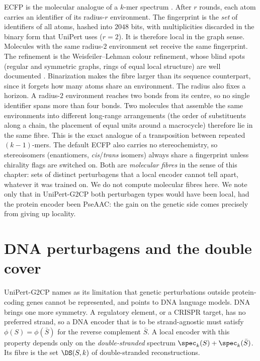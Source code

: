 ECFP is the molecular analogue of a $k$-mer spectrum \cite{RH10}. After $r$ rounds, each atom carries
an identifier of its radius-$r$ environment. The fingerprint is the \emph{set} of identifiers of all
atoms, hashed into $2048$ bits, with multiplicities discarded in the binary form that UniPert uses
($r=2$). It is therefore local in the graph sense. Molecules with the same radius-$2$ environment
set receive the same fingerprint. The refinement is the Weisfeiler--Lehman colour refinement, whose
blind spots (regular and symmetric graphs, rings of equal local structure) are well
documented \cite{XHLJ19}. Binarization makes the fibre larger than its sequence counterpart, since it
forgets how many atoms share an environment. The radius also fixes a horizon. A radius-$2$
environment reaches two bonds from its centre, so no single identifier spans more than four bonds.
Two molecules that assemble the same environments into different long-range arrangements (the
order of substituents along a chain, the placement of equal units around a macrocycle) therefore
lie in the same fibre. This is the exact analogue of a transposition between repeated
$(k-1)$-mers. The default ECFP also carries no stereochemistry, so stereoisomers (enantiomers,
\emph{cis}/\emph{trans} isomers) always share a fingerprint unless chirality flags are switched on.
Both are \emph{molecular fibres} in the sense of this chapter: sets of distinct perturbagens that a local
encoder cannot tell apart, whatever it was trained on. We do not compute molecular fibres here. We note only
that in UniPert-G2CP both perturbagen types would have been local, had the protein encoder been
PseAAC: the gain on the genetic side comes precisely from giving up locality.

\section{DNA perturbagens and the double cover}\label{ch12:sec:dna}

UniPert-G2CP names as its limitation that genetic perturbations outside protein-coding genes cannot
be represented, and points to DNA language models. DNA brings one more symmetry. A regulatory
element, or a CRISPR target, has no preferred strand, so a DNA encoder that is to be strand-agnostic
must satisfy $\phi(S)=\phi(\bar S)$ for the reverse complement $\bar S$. A local encoder with this
property depends only on the \emph{double-stranded} spectrum $\spec_k(S)+\spec_k(\bar S)$. Its fibre
is the set $\DS(S,k)$ of double-stranded reconstructions.


